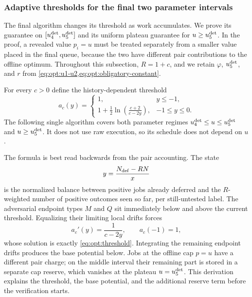 \subsubsection{Adaptive thresholds for the final two parameter intervals}
\label{sec:optional-upper}

The final algorithm changes its threshold as work accumulates.  We prove its
guarantee on $[u_{4}^{\mathrm{det}},u_{5}^{\mathrm{det}}]$ and its uniform plateau
guarantee for $u\ge u_{5}^{\mathrm{det}}$.  In the proof, a revealed value $p_i=u$ must
be treated separately from a smaller value placed in the final queue,
because the two have different pair contributions to the offline optimum.
Throughout this subsection, $R=1+c$, and we retain $\varphi$, $u_{5}^{\mathrm{det}}$,
and $r$ from
\cref{eq:opt:u1-u2,eq:opt:obligatory-constant}.

For every $c>0$ define the history-dependent threshold
\begin{equation}
 a_c(y)=
 \begin{cases}
  1, & y\le-1,\\[1mm]
  \displaystyle
  1+\frac12\ln\!\left(\frac{c+2}{c-2y}\right),
      & -1\le y\le0.
 \end{cases}
 \label{eq:opt:threshold}
\end{equation}
The following single algorithm covers both parameter regimes
$u_{4}^{\mathrm{det}}\le u\le u_{5}^{\mathrm{det}}$ and $u\ge u_{5}^{\mathrm{det}}$.  It does not use raw
execution, so its schedule does not depend on $u$.

The formula is best read backwards from the pair accounting.  The state
\[
 y=\frac{N_{\rm def}-R N}{x}
\]
is the normalized balance between positive jobs already deferred and the
$R$-weighted number of positive outcomes seen so far, per still-untested
label.  The adversarial endpoint types $M$ and $Q$ sit immediately below and
above the current threshold.  Equalizing their limiting local drifts forces
\begin{equation}
 a_c'(y)=\frac1{c-2y},
 \qquad a_c(-1)=1,
 \label{eq:opt:threshold-ode-motivation}
\end{equation}
whose solution is exactly \cref{eq:opt:threshold}.  Integrating the remaining
endpoint drifts produces the base potential below.  Jobs at the offline cap
$p=u$ have a different pair charge; on the middle interval their remaining
part is stored in a separate cap reserve, which vanishes at the plateau
$u=u_{5}^{\mathrm{det}}$.  This derivation explains the threshold, the base potential,
and the additional reserve term before the verification starts.

